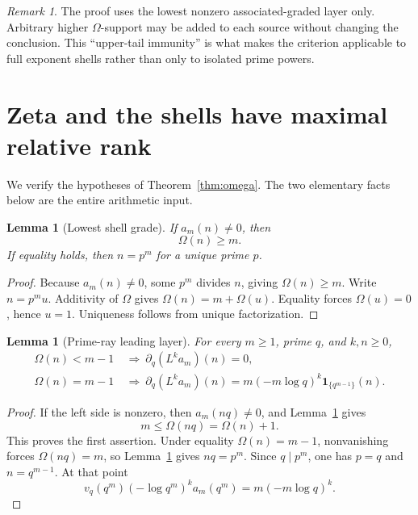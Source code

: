 \documentclass[11pt]{article}
\newtheorem{lemma}[theorem]{Lemma}
\theoremstyle{definition}
\theoremstyle{remark}
\newtheorem{remark}[theorem]{Remark}
\begin{document}
\begin{remark}
The proof uses the lowest nonzero associated-graded layer only.  Arbitrary higher
\(\Omega\)-support may be added to each source without changing the conclusion.  This
``upper-tail immunity'' is what makes the criterion applicable to full exponent shells rather
than only to isolated prime powers.
\end{remark}

\section{Zeta and the shells have maximal relative rank}\label{sec:application}

We verify the hypotheses of Theorem~\ref{thm:omega}.  The two elementary facts below are the
entire arithmetic input.

\begin{lemma}[Lowest shell grade]\label{lem:lowest-shell}
If \(a_m(n)\ne0\), then
\[
 \Omega(n)\geq m.
\]
If equality holds, then \(n=p^m\) for a unique prime \(p\).
\end{lemma}

\begin{proof}
Because \(a_m(n)\ne0\), some \(p^m\) divides \(n\), giving \(\Omega(n)\geq m\).
Write \(n=p^mu\).  Additivity of \(\Omega\) gives
\(\Omega(n)=m+\Omega(u)\).  Equality forces \(\Omega(u)=0\), hence \(u=1\).
Uniqueness follows from unique factorization.
\end{proof}

\begin{lemma}[Prime-ray leading layer]\label{lem:prime-ray}
For every \(m\geq1\), prime \(q\), and \(k,n\geq0\),
\begin{align*}
 \Omega(n)<m-1
 &\ \Longrightarrow\
 \partial_q(L^ka_m)(n)=0,\\
 \Omega(n)=m-1
 &\ \Longrightarrow\
 \partial_q(L^ka_m)(n)
 =m(-m\log q)^k\mathbf 1_{\{q^{m-1}\}}(n).
\end{align*}
\end{lemma}

\begin{proof}
If the left side is nonzero, then \(a_m(nq)\ne0\), and
Lemma~\ref{lem:lowest-shell} gives
\[
 m\leq\Omega(nq)=\Omega(n)+1.
\]
This proves the first assertion.  Under equality \(\Omega(n)=m-1\), nonvanishing forces
\(\Omega(nq)=m\), so Lemma~\ref{lem:lowest-shell} gives \(nq=p^m\).  Since \(q\mid p^m\),
one has \(p=q\) and \(n=q^{m-1}\).  At that point
\[
 v_q(q^m)(-\log q^m)^ka_m(q^m)
 =m(-m\log q)^k.
\]
\end{proof}
\end{document}
